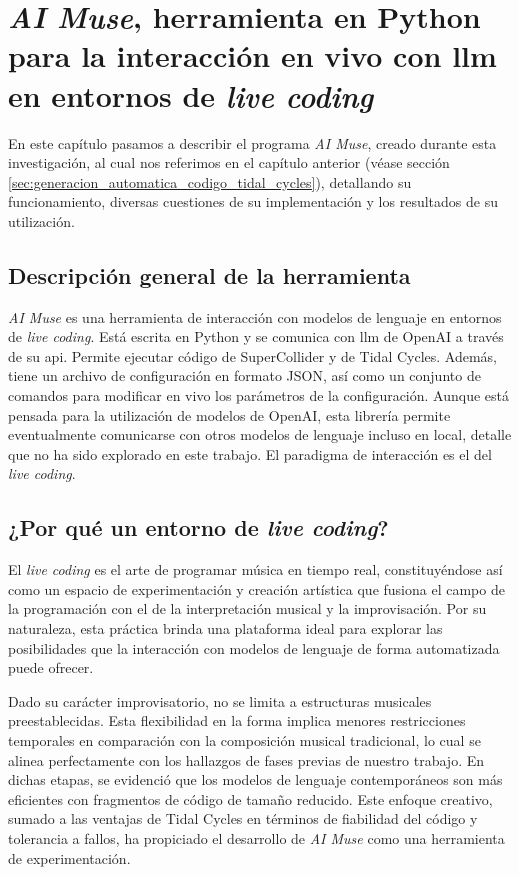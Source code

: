 \chapter{\emph{AI Muse}, herramienta en {Python} para la interacción en vivo con \gls{llm} en entornos de \emph{live coding}}
\label{chap:ai_muse}


En este capítulo pasamos a describir el programa \emph{AI Muse}, creado durante esta investigación, al cual nos referimos en el capítulo anterior (véase sección \ref{sec:generacion_automatica_codigo_tidal_cycles}), detallando su funcionamiento, diversas cuestiones de su implementación y los resultados de su utilización.

\section{Descripción general de la herramienta}

\emph{AI Muse} es una herramienta de interacción con modelos de lenguaje en entornos de \emph{live coding}. Está escrita en Python y se comunica con \gls{llm} de OpenAI a través de su \gls{api}. Permite ejecutar código de SuperCollider y de Tidal Cycles. Además, tiene un archivo de configuración en formato JSON, así como un conjunto de comandos para modificar en vivo los parámetros de la configuración. Aunque está pensada para la utilización de modelos de OpenAI, esta librería permite eventualmente comunicarse con otros modelos de lenguaje incluso en local, detalle que no ha sido explorado en este trabajo. El paradigma de interacción es el del \emph{live coding}.

\section{¿Por qué un entorno de \emph{live coding}?}

El \emph{live coding} es el arte de programar música en tiempo real, constituyéndose así como un espacio de experimentación y creación artística que fusiona el campo de la programación con el de la interpretación musical y la improvisación. Por su naturaleza, esta práctica brinda una plataforma ideal para explorar las posibilidades que la interacción con modelos de lenguaje de forma automatizada puede ofrecer.

Dado su carácter improvisatorio, no se limita a estructuras musicales preestablecidas. Esta flexibilidad en la forma implica menores restricciones temporales en comparación con la composición musical tradicional, lo cual se alinea perfectamente con los hallazgos de fases previas de nuestro trabajo. En dichas etapas, se evidenció que los modelos de lenguaje contemporáneos son más eficientes con fragmentos de código de tamaño reducido. Este enfoque creativo, sumado a las ventajas de Tidal Cycles en términos de fiabilidad del código y tolerancia a fallos, ha propiciado el desarrollo de \emph{AI Muse} como una herramienta de experimentación.


